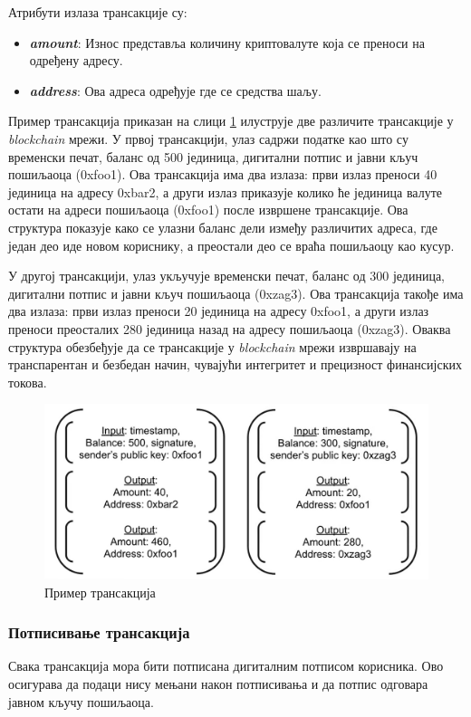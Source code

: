\documentclass[12pt, a4paper]{article}
\begin{document}
Атрибути излаза трансакције су:
\begin{itemize}
    \item \textbf{\textit{amount}}: Износ представља количину криптовалуте која се преноси на одређену адресу.
    \item \textbf{\textit{address}}: Ова адреса одређује где се средства шаљу.
\end{itemize}

Пример трансакција приказан на слици \ref{fig:transactions-example} илуструје две различите трансакције у \textit{blockchain} мрежи. У првој трансакцији, улаз садржи податке као што су временски печат, баланс од 500 јединица, дигитални потпис и јавни кључ пошиљаоца (0xfoo1). Ова трансакција има два излаза: први излаз преноси 40 јединица на адресу 0xbar2, а други излаз приказује колико ће јединица валуте остати на адреси пошиљаоца (0xfoo1) после извршене трансакције. Ова структура показује како се улазни баланс дели између различитих адреса, где један део иде новом кориснику, а преостали део се враћа пошиљаоцу као кусур.

У другој трансакцији, улаз укључује временски печат, баланс од 300 јединица, дигитални потпис и јавни кључ пошиљаоца (0xzag3). Ова трансакција такође има два излаза: први излаз преноси 20 јединица на адресу 0xfoo1, а други излаз преноси преосталих 280 јединица назад на адресу пошиљаоца (0xzag3). Оваква структура обезбеђује да се трансакције у \textit{blockchain} мрежи извршавају на транспарентан и безбедан начин, чувајући интегритет и прецизност финансијских токова.


\begin{figure}[h]
    \centering
    \includegraphics[width=1\linewidth]{slike/transactions-example.png}
    \caption{Пример трансакција}
    \label{fig:transactions-example}
\end{figure}

\subsubsection{Потписивање трансакција}
Свака трансакција мора бити потписана дигиталним потписом корисника. Ово осигурава да подаци нису мењани након потписивања и да потпис одговара јавном кључу пошиљаоца.
\end{document}
